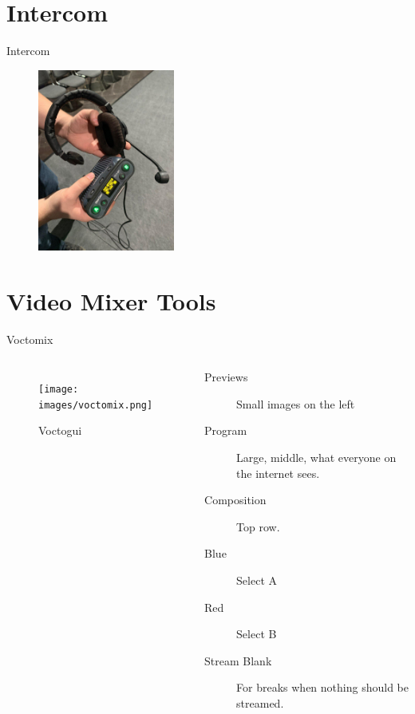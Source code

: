 \documentclass[aspectratio=169]{beamer}
\begin{document}
\section{Intercom} %
 \begin{frame}{Intercom}
 	\begin{figure} 
 		\centering
 		\includegraphics[width=0.4\textwidth]{images/intercom_36c3.jpg}
 	\end{figure}
\end{frame}

\section{Video Mixer Tools}

\begin{frame}{Voctomix}
	\begin{columns}[T,onlytextwidth]
	\begin{figure} 
		\centering
		\texttt{[image: images/voctomix.png]}
		\caption{Voctogui}
		\label{fig:voctogui1}
	\end{figure}

	\begin{description}
		\item[Previews] Small images on the left 
		\item[Program] Large, middle, what everyone on the internet sees.
		\item[Composition] Top row.
		\item[Blue] Select A
		\item[Red] Select B
		\item[Stream Blank] For breaks when nothing should be streamed.
     \end{description}
	\end{columns}
\end{frame}
\end{document}
